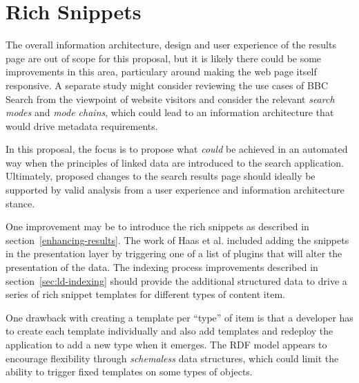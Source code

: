 \section{Rich Snippets}

The overall information architecture, design and user experience of
the results page are out of scope for this proposal, but it is likely
there could be some improvements in this area, particulary around making
the web page itself responsive\cite{marcotte2010responsive}. A separate
study might consider reviewing the use cases of BBC Search from
the viewpoint of website visitors and consider the relevant
\emph{search modes} and \emph{mode chains}, which could lead to
an information architecture that would drive metadata requirements.

In this proposal, the focus is to propose what \emph{could} be
achieved in an automated way when the principles of linked data
are introduced to the search application. Ultimately, proposed
changes to the search results page should ideally be supported
by valid analysis from a user experience and information
architecture stance.

One improvement may be to introduce the rich snippets as described
in section~\ref{enhancing-results}. The work of Haas et
al.\cite{haas2011enhanced} included adding the snippets in the presentation
layer by triggering one of a list of plugins that will alter the
presentation of the data. The indexing process improvements
described in section~\ref{sec:ld-indexing} should provide the
additional structured data to drive a series of rich snippet templates
for different types of content item.

One drawback with creating a template per ``type'' of item is that a
developer has to create each template individually and also add templates
and redeploy the application to add a new type when it emerges.
The RDF model appears to encourage flexibility through
\emph{schemaless} data structures, which could limit the ability to
trigger fixed templates on some types of objects.
